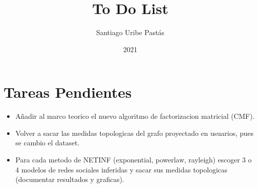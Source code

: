\documentclass{article}
\title{To Do List}
\author{Santiago Uribe Pastás}
\date{2021}
\begin{document}
\maketitle

\section{Tareas Pendientes}
\begin{itemize}
    \item Añadir al marco teorico el nuevo algoritmo de factorizacion matricial (CMF).
    \item Volver a sacar las medidas topologicas del grafo proyectado en usuarios, pues se cambio el dataset.
    \item Para cada metodo de NETINF (exponential, powerlaw, rayleigh) escoger 3 o 4 modelos de redes sociales inferidas y sacar sus medidas topologicas (documentar resultados y graficas).
\end{itemize}
\end{document}
